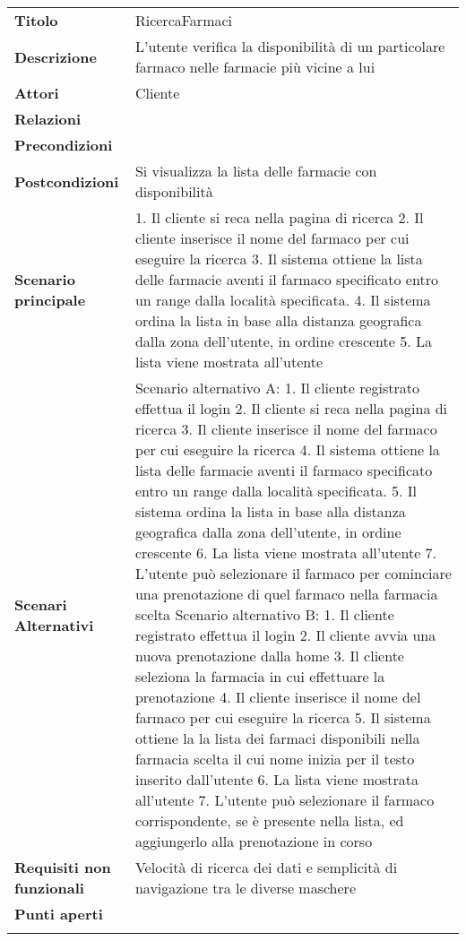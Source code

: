 \begin{longtable}[c]{@{}ll@{}}
\toprule\addlinespace
\textbf{Titolo} & RicercaFarmaci
\\\addlinespace
\textbf{Descrizione} & L'utente verifica la disponibilità di un
particolare farmaco nelle farmacie più vicine a lui
\\\addlinespace
\textbf{Attori} & Cliente
\\\addlinespace
\textbf{Relazioni} &
\\\addlinespace
\textbf{Precondizioni} &
\\\addlinespace
\textbf{Postcondizioni} & Si visualizza la lista delle farmacie con
disponibilità
\\\addlinespace
\textbf{Scenario principale} & 1. Il cliente si reca nella pagina di
ricerca 2. Il cliente inserisce il nome del farmaco per cui eseguire la
ricerca 3. Il sistema ottiene la lista delle farmacie aventi il farmaco
specificato entro un range dalla località specificata. 4. Il sistema
ordina la lista in base alla distanza geografica dalla zona dell'utente,
in ordine crescente 5. La lista viene mostrata all'utente
\\\addlinespace
\textbf{Scenari Alternativi} & Scenario alternativo A: 1. Il cliente
registrato effettua il login 2. Il cliente si reca nella pagina di
ricerca 3. Il cliente inserisce il nome del farmaco per cui eseguire la
ricerca 4. Il sistema ottiene la lista delle farmacie aventi il farmaco
specificato entro un range dalla località specificata. 5. Il sistema
ordina la lista in base alla distanza geografica dalla zona dell'utente,
in ordine crescente 6. La lista viene mostrata all'utente 7. L'utente
può selezionare il farmaco per cominciare una prenotazione di quel
farmaco nella farmacia scelta Scenario alternativo B: 1. Il cliente
registrato effettua il login 2. Il cliente avvia una nuova prenotazione
dalla home 3. Il cliente seleziona la farmacia in cui effettuare la
prenotazione 4. Il cliente inserisce il nome del farmaco per cui
eseguire la ricerca 5. Il sistema ottiene la la lista dei farmaci
disponibili nella farmacia scelta il cui nome inizia per il testo
inserito dall'utente 6. La lista viene mostrata all'utente 7. L'utente
può selezionare il farmaco corrispondente, se è presente nella lista, ed
aggiungerlo alla prenotazione in corso
\\\addlinespace
\textbf{Requisiti non funzionali} & Velocità di ricerca dei dati e
semplicità di navigazione tra le diverse maschere
\\\addlinespace
\textbf{Punti aperti} &
\\\addlinespace
\bottomrule
\end{longtable}

